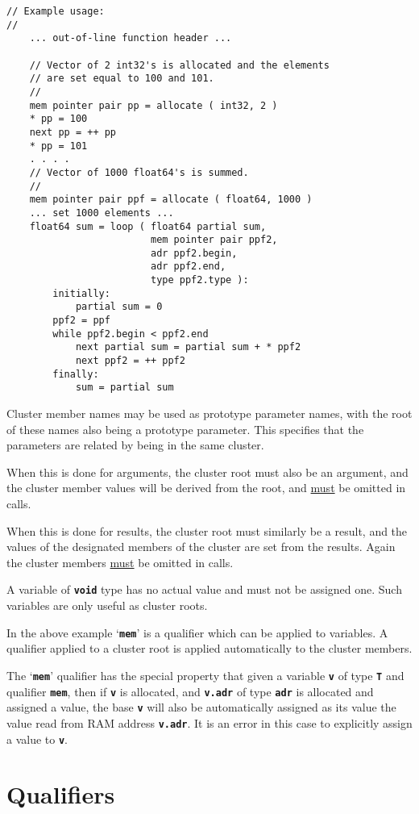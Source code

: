 \documentclass[12pt]{article}
\newcommand{\TT}[1]{{\tt \bfseries #1}}
\newenvironment{indpar}[1][0.3in]%
	{\begin{list}{}%
		     {\setlength{\itemsep}{0in}%
		      \setlength{\topsep}{0in}%
		      \setlength{\parsep}{1ex}%
		      \setlength{\labelwidth}{#1}%
		      \setlength{\leftmargin}{#1}%
		      \addtolength{\leftmargin}{\labelsep}}%
	 \item}%
	{\end{list}}
\begin{document}
\begin{indpar}
\begin{verbatim}
// Example usage:
//
    ... out-of-line function header ...

    // Vector of 2 int32's is allocated and the elements
    // are set equal to 100 and 101.
    //
    mem pointer pair pp = allocate ( int32, 2 )
    * pp = 100
    next pp = ++ pp
    * pp = 101
    . . . .
    // Vector of 1000 float64's is summed.
    //
    mem pointer pair ppf = allocate ( float64, 1000 )
    ... set 1000 elements ...
    float64 sum = loop ( float64 partial sum,
                         mem pointer pair ppf2,
                         adr ppf2.begin,
                         adr ppf2.end,
                         type ppf2.type ):
        initially:
            partial sum = 0
	    ppf2 = ppf
        while ppf2.begin < ppf2.end
            next partial sum = partial sum + * ppf2
            next ppf2 = ++ ppf2
        finally:
            sum = partial sum
\end{verbatim}\end{indpar}

Cluster member names may be used as prototype parameter
names, with the root of these names also being a prototype
parameter.  This specifies that the parameters are related
by being in the same cluster.

When this is done for arguments, the cluster root must
also be an argument, and the cluster member values
will be derived from the root, and \underline{must}
be omitted in calls.

When this is done for results, the cluster root must similarly
be a result, and the values of the designated
members of the cluster are set from the results.
Again the cluster members \underline{must} be omitted in calls.

A variable of \TT{void} type has no actual value
and must not be assigned one.  Such variables are only useful
as cluster roots.

In the above example `\TT{mem}' is a qualifier
which can be applied to variables.
A qualifier applied to a cluster root is applied automatically
to the cluster members.

The `\TT{mem}' qualifier has the special property that given a variable
\TT{v} of type \TT{T} and qualifier \TT{mem}, then if \TT{v} is allocated,
and \TT{v.adr} of type \TT{adr} is allocated and
assigned a value, the base \TT{v} will also be automatically
assigned as its value the value read from RAM address \TT{v.adr}.
It is an error in this case to explicitly assign a value to \TT{v}.

\section{Qualifiers}
\label{QUALIFIERS}
\end{document}
